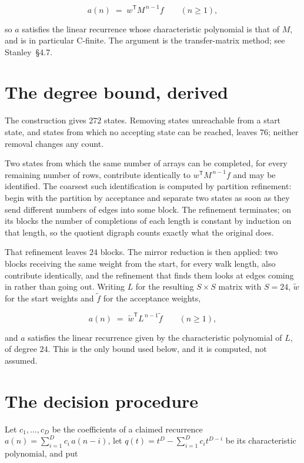\documentclass[11pt]{article}
\theoremstyle{definition}
\begin{document}
\[a(n) \;=\; w^{\mathsf T} M^{\,n-1} f \qquad (n \ge 1),\]

so $a$ satisfies the linear recurrence whose characteristic polynomial is that of $M$, and is in particular C-finite. The argument is the transfer-matrix method; see Stanley~\S4.7.

\section{The degree bound, derived}

The construction gives $272$ states. Removing states unreachable from a start state, and states from which no accepting state can be reached, leaves $76$; neither removal changes any count.

Two states from which the same number of arrays can be completed, for every remaining number of rows, contribute identically to $w^{\mathsf T}M^{\,n-1}f$ and may be identified. The coarsest such identification is computed by partition refinement: begin with the partition by acceptance and separate two states as soon as they send different numbers of edges into some block. The refinement terminates; on its blocks the number of completions of each length is constant by induction on that length, so the quotient digraph counts exactly what the original does.

That refinement leaves $24$ blocks. The mirror reduction is then applied: two blocks receiving the same weight from the start, for every walk length, also contribute identically, and the refinement that finds them looks at edges coming in rather than going out. Writing $L$ for the resulting $S \times S$ matrix with $S = 24$, $\tilde w$ for the start weights and $\tilde f$ for the acceptance weights,

\[a(n) \;=\; \tilde w^{\mathsf T} L^{\,n-1} \tilde f \qquad (n \ge 1),\]

and $a$ satisfies the linear recurrence given by the characteristic polynomial of $L$, of degree $24$. This is the only bound used below, and it is computed, not assumed.

\section{The decision procedure}

Let $c_1,\dots,c_D$ be the coefficients of a claimed recurrence $a(n) = \sum_{i=1}^{D} c_i\,a(n-i)$, let $q(t) = t^{D} - \sum_{i=1}^{D} c_i t^{D-i}$ be its characteristic polynomial, and put
\end{document}
